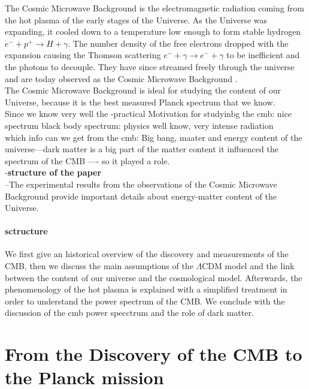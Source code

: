 \documentclass{article}
\begin{document}
The Cosmic Microwave Background is the electromagnetic radiation coming from the hot plasma of the early stages of the Universe.
As the Universe was expanding, it cooled down to a temperature low enough to form stable hydrogen $e^- + p^+  \rightarrow H + \gamma$. The number density of the free electrons dropped with the expansion causing the Thomson scattering $e^- + \gamma  \rightarrow e^- + \gamma$ to be inefficient and the photons to decouple. They have since streamed freely through the universe and are today observed as the Cosmic Microwave Background \citep{LecturesPdf}.\\
The Cosmic Microwave Background is ideal for studying the content of our Universe, because it is the best measured Planck spectrum that we know.\\
Since we know very well the 
-practical Motivation for studyinbg the cmb: nice spectrum black body spectrum: physics well know, very intense radiation\\
which info can we get from the cmb: Big bang, maater and energy content of the universe---dark matter is a big part of the matter content it influenced the spectrum  of the CMB ---- so it played a role.\\
-\textbf{structure of the paper} \\
--The experimental results from the observations of the Cosmic Microwave Background provide important details about energy-matter content of the Universe.\\
\paragraph{sctructure}
We first give an historical overview of the discovery and measurements of the CMB, then we discuss the main assumptions of the $\Lambda$CDM model and the link between the content of our universe and the cosmological model. Afterwards, the phenomenology of the hot plasma is explained with a simplified treatment in order to understand the power spectrum of the CMB.
We conclude with the discussion of the cmb power specctrum and the role of dark matter.



\section{From the Discovery of the CMB to the Planck mission}
\end{document}
